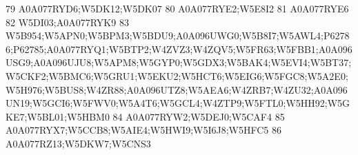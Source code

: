 \documentclass{beamer}
\begin{document}
\begin{frame}[fragile]
\begin{itemize}
\begin{Schunk}
\begin{Soutput}
79                                                                                                                                                                                                                                                                                                                                                       A0A077RYD6;W5DK12;W5DK07
80                                                                                                                                                                                                                                                                                                                                                              A0A077RYE2;W5E8I2
81                                                                                                                                                                                                                                                                                                                                                                     A0A077RYE6
82                                                                                                                                                                                                                                                                                                                                                              W5DI03;A0A077RYK9
83 W5B954;W5APN0;W5BPM3;W5BDU9;A0A096UWG0;W5B8I7;W5AWL4;P62786;P62785;A0A077RYQ1;W5BTP2;W4ZVZ3;W4ZQV5;W5FR63;W5FBB1;A0A096USG9;A0A096UJU8;W5APM8;W5GYP0;W5GDX3;W5BAK4;W5EVI4;W5BT37;W5CKF2;W5BMC6;W5GRU1;W5EKU2;W5HCT6;W5EIG6;W5FGC8;W5A2E0;W5H976;W5BUS8;W4ZR88;A0A096UTZ8;W5AEA6;W4ZRB7;W4ZU32;A0A096UN19;W5GCI6;W5FWV0;W5A4T6;W5GCL4;W4ZTP9;W5FTL0;W5HH92;W5GKE7;W5BL01;W5HBM0
84                                                                                                                                                                                                                                                                                                                                                       A0A077RYW2;W5DEJ0;W5CAF4
85                                                                                                                                                                                                                                                                                                                                  A0A077RYX7;W5CCB8;W5AIE4;W5HWI9;W5I6J8;W5HFC5
86                                                                                                                                                                                                                                                                                                                                                       A0A077RZ13;W5DKW7;W5CNS3

\end{Soutput}
\end{Schunk}
\end{itemize}
\end{frame}
\end{document}
